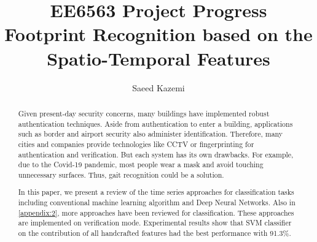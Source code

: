 \begin{frontmatter}
%
\title{\Huge EE6563 Project Progress\\ Footprint Recognition based on the\\ Spatio-Temporal Features }


\author{Saeed Kazemi}
\address{University of New Brunswick}


\begin{abstract}
Given present-day security concerns, many buildings have implemented robust authentication techniques. Aside from authentication to enter a building, applications such as border and airport security also administer identification. Therefore, many cities and companies provide technologies like CCTV or fingerprinting for authentication and verification. But each system has its own drawbacks. For example, due to the Covid-19 pandemic, most people wear a mask and avoid touching unnecessary surfaces. Thus, gait recognition could be a solution. 







In this paper, we present a review of the time series approaches for classification tasks including conventional machine learning algorithm and Deep Neural Networks. Also in \ref{appendix:2}, more approaches have been reviewed for classification. These approaches are implemented on verification mode. Experimental results show that SVM classifier on the contribution of all handcrafted features had the best performance with 91.3\%.


\end{abstract}
\end{frontmatter}
